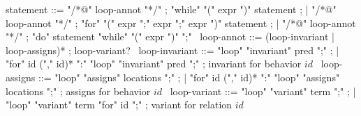 \begin{syntax}
  statement ::= "/*@" loop-annot "*/" ;
  "while" "(" expr ")" statement ;
  | "/*@" loop-annot "*/" ;
  "for" "(" expr ";" expr ";" expr ")" statement ;
  | "/*@" loop-annot "*/" ;
  "do" statement "while" "(" expr ")" ";" 
  \
  loop-annot ::= (loop-invariant | loop-assigns)* ;
  loop-variant?
  \
  loop-invariant ::= "loop" "invariant" pred ";" ;
  | {"for" id ("," id)* ":" "loop" "invariant" pred ";"} ; invariant for behavior $id$
  \
  loop-assigns ::= "loop" "assigns" locations ";" ;
  | {"for" id ("," id)* ":" "loop" "assigns" locations ";"} ; assigns for behavior $id$
  \
  loop-variant ::= "loop" "variant" term ";" ;
  | "loop" "variant" term "for" id ";" ; variant for relation $id$
  \
\end{syntax}
